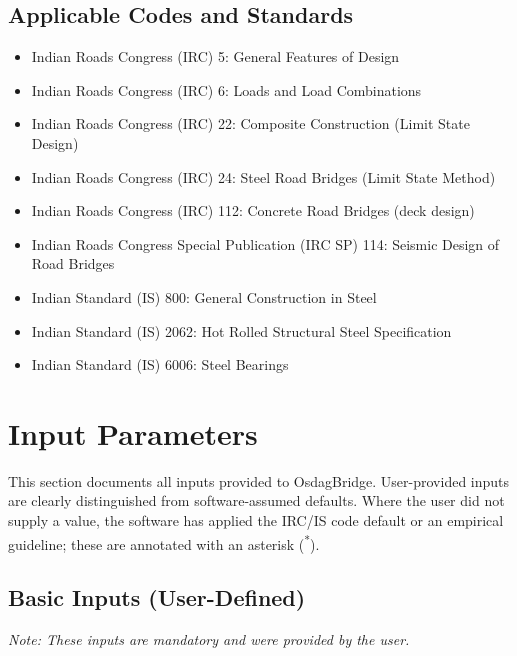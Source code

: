 \documentclass[12pt,a4paper]{report}
\makeatletter
\numberwithin{table}{chapter}
\numberwithin{figure}{chapter}
\newcommand{\sdonpage}[1]{\global\@namedef{sd@page@#1}{}}
\newcommand{\sdstar}{\textsuperscript{*}\protected@write\@auxout{}{\string\sdonpage{\thepage}}}
\makeatother
\begin{document}
\section{Applicable Codes and Standards}
\label{sec:codes}

\begin{itemize}
\item Indian Roads Congress (IRC) 5: General Features of Design
\item Indian Roads Congress (IRC) 6: Loads and Load Combinations
\item Indian Roads Congress (IRC) 22: Composite Construction (Limit State Design)
\item Indian Roads Congress (IRC) 24: Steel Road Bridges (Limit State Method)
\item Indian Roads Congress (IRC) 112: Concrete Road Bridges (deck design)
\item Indian Roads Congress Special Publication (IRC SP) 114: Seismic Design of Road Bridges
\item Indian Standard (IS) 800: General Construction in Steel
\item Indian Standard (IS) 2062: Hot Rolled Structural Steel Specification
\item Indian Standard (IS) 6006: Steel Bearings
\end{itemize}


\chapter{Input Parameters}

\setlength{\abovecaptionskip}{2pt}
\setlength{\belowcaptionskip}{2pt}

This section documents all inputs provided to OsdagBridge. User-provided inputs are clearly distinguished from software-assumed defaults. Where the user did not supply a value, the software has applied the IRC/IS code default or an empirical guideline; these are annotated with an asterisk (\sdstar{}).

\section{Basic Inputs (User-Defined)}
\label{sec:basic-inputs}

\noindent\textit{Note: These inputs are mandatory and were provided by the user.}
\end{document}
